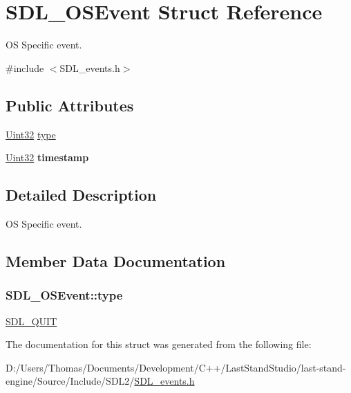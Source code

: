 \hypertarget{structSDL__OSEvent}{}\section{S\+D\+L\+\_\+\+O\+S\+Event Struct Reference}
\label{structSDL__OSEvent}


O\+S Specific event.  




{\ttfamily \#include $<$S\+D\+L\+\_\+events.\+h$>$}

\subsection*{Public Attributes}
\begin{DoxyCompactItemize}
\item 
\hyperlink{SDL__stdinc_8h_add440eff171ea5f55cb00c4a9ab8672d}{Uint32} \hyperlink{structSDL__OSEvent_a85a600619ebebc8db007fc757b3895a5}{type}
\item 
\hypertarget{structSDL__OSEvent_a8b2480eefadad9f3f8c94f8e550b7fb0}{}\hyperlink{SDL__stdinc_8h_add440eff171ea5f55cb00c4a9ab8672d}{Uint32} {\bfseries timestamp}\label{structSDL__OSEvent_a8b2480eefadad9f3f8c94f8e550b7fb0}

\end{DoxyCompactItemize}


\subsection{Detailed Description}
O\+S Specific event. 

\subsection{Member Data Documentation}
\hypertarget{structSDL__OSEvent_a85a600619ebebc8db007fc757b3895a5}{}
\subsubsection[{type}]{ S\+D\+L\+\_\+\+O\+S\+Event\+::type}\label{structSDL__OSEvent_a85a600619ebebc8db007fc757b3895a5}
\hyperlink{SDL__events_8h_a3b589e89be6b35c02e0dd34a55f3fccaa31acc5fdafc86ebe2c1f5c3cae48d603}{S\+D\+L\+\_\+\+Q\+U\+I\+T} 

The documentation for this struct was generated from the following file\+:\begin{DoxyCompactItemize}
\item 
D\+:/\+Users/\+Thomas/\+Documents/\+Development/\+C++/\+Last\+Stand\+Studio/last-\/stand-\/engine/\+Source/\+Include/\+S\+D\+L2/\hyperlink{SDL__events_8h}{S\+D\+L\+\_\+events.\+h}\end{DoxyCompactItemize}
